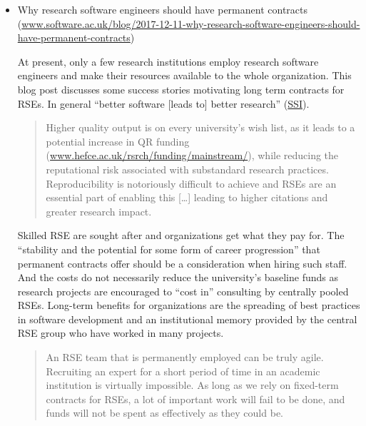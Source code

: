 \documentclass[11pt,letterpaper]{article}
\begin{document}
\begin{itemize}
\item Why research software engineers should have permanent contracts (\href{https://www.software.ac.uk/blog/2017-12-11-why-research-software-engineers-should-have-permanent-contracts}{www.software.ac.uk/blog/2017-12-11-why-research-software-engineers-should-have-permanent-contracts})

\noindent At present, only a few research institutions employ research software engineers and make their resources available to the whole organization. This blog post discusses some success stories motivating long term contracts for RSEs. In general ``better software [leads to] better research'' (\href{https://software.ac.uk/}{SSI}).
\begin{quote}
Higher quality output is on every university's wish list, as it leads to a potential increase in QR funding (\href{http://www.hefce.ac.uk/rsrch/funding/mainstream/}{www.hefce.ac.uk/rsrch/funding/mainstream/}), while reducing the reputational risk associated with substandard research practices.
Reproducibility is notoriously difficult to achieve and RSEs are an essential part of enabling this [\ldots] leading to higher citations and greater research impact.
\end{quote}
Skilled RSE are sought after and organizations get what they pay for. The ``stability and the potential for some form of career progression'' that permanent contracts offer should be a consideration when hiring such staff. And the costs do not necessarily reduce the university's baseline funds as research projects are encouraged to ``cost in'' consulting by centrally pooled RSEs. Long-term benefits for organizations are the spreading of best practices in software development and an institutional memory provided by the central RSE group who have worked in many projects. 
\begin{quote}
An RSE team that is permanently employed can be truly agile. Recruiting an expert for a short period of time in an academic institution is virtually impossible. As long as we rely on fixed-term contracts for RSEs, a lot of important work will fail to be done, and funds will not be spent as effectively as they could be.
\end{quote}


\end{itemize}
\end{document}
